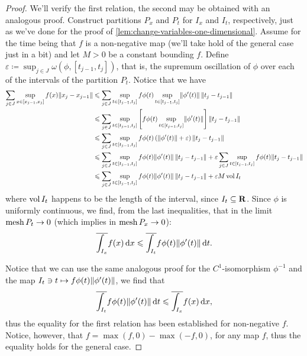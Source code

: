 \begin{proof}
We'll verify the first relation, the second may be obtained with an analogous
proof. Construct partitions \(P_x\) and \(P_t\) for \(I_x\) and \(I_t\),
respectively, just as we've done for the proof of
\cref{lem:change-variables-one-dimensional}. Assume for the time being that
\(f\) is a non-negative map (we'll take hold of the general case just in a
bit) and let \(M > 0\) be a constant bounding \(f\). Define \(\varepsilon
\coloneq \sup_{j \in J} \omega(\phi, [t_{j-1}, t_j])\), that is, the supremum
oscillation of \(\phi\) over each of the intervals of the partition
\(P_t\). Notice that we have
{\footnotesize%
\begin{align*}
  \sum_{j \in J} \sup_{x \in [x_{j-1}, x_j]} f(x) \lVert x_j - x_{j-1}\rVert
  &\leqslant \sum_{j \in J} \sup_{t \in [t_{j-1}, t_j]} f \phi(t)
    \sup_{t \in [t_{j-1}, t_j]} \lVert\phi'(t)\rVert\, \lVert t_j - t_{j-1}\rVert \\
  &\leqslant \sum_{j \in J} \sup_{t \in [t_{j-1}, t_j]}
    \left[
    f \phi(t) \sup_{t \in [t_{j-1}, t_j]} \lVert\phi'(t)\rVert
    \right]
    \lVert t_j - t_{j-1}\rVert \\
  &\leqslant \sum_{j \in J} \sup_{t \in [t_{j-1}, t_j]}
    f \phi(t) \left( \lVert\phi'(t)\rVert + \varepsilon \right)
    \lVert t_j - t_{j-1}\rVert \\
  &\leqslant \sum_{j \in J} \sup_{t \in [t_{j-1}, t_j]}
    f \phi(t) \lVert\phi'(t)\rVert\, \lVert t_j - t_{j-1}\rVert
    + \varepsilon \sum_{j \in J} \sup_{t \in [t_{j-1}, t_j]}
    f\phi(t) \lVert t_j - t_{j-1}\rVert \\
  &\leqslant \sum_{j \in J} \sup_{t \in [t_{j-1}, t_j]}
    f \phi(t) \lVert\phi'(t)\rVert\, \lVert t_j - t_{j-1}\rVert
    + \varepsilon M \operatorname{vol} I_t
\end{align*}
}%
where \(\operatorname{vol} I_t\) happens to be the length of the interval, since \(I_t
\subseteq \mathbf{R}\). Since \(\phi\) is uniformly continuous, we find, from the last
inequalities, that in the limit \(\operatorname{mesh} P_t \to 0\) (which implies in \(\operatorname{mesh}
P_x \to 0\)):
\[
  \overline{\int_{I_x}} f(x)\, \mathrm{d} x
  \leqslant \overline{\int_{I_t}} f \phi(t) \lVert\phi'(t)\rVert\, \mathrm{d} t.
\]

Notice that we can use the same analogous proof for the \(C^1\)-isomorphism
\(\phi^{-1}\) and the map \(I_t \ni t \mapsto f \phi(t) \lVert\phi'(t)\rVert\), we
find that
\[
  \overline{\int_{I_t}} f \phi(t) \lVert\phi'(t)\rVert\, \mathrm{d} t
  \leqslant \overline{\int_{I_x}} f(x)\, \mathrm{d} x,
\]
thus the equality for the first relation has been established for non-negative
\(f\). Notice, however, that \(f = \max(f, 0) - \max(-f, 0)\), for any map
\(f\), thus the equality holds for the general case.
\end{proof}

